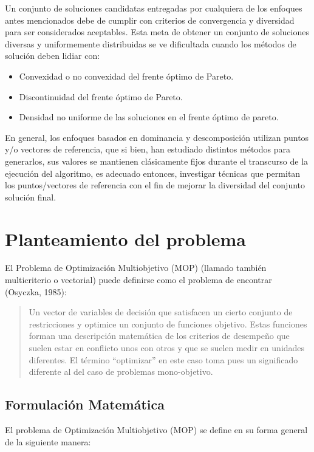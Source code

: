 \documentclass[letterpaper,10pt]{article}
\begin{document}
Un conjunto de soluciones candidatas entregadas por cualquiera de los enfoques antes mencionados debe de cumplir con criterios de convergencia y diversidad para ser
considerados aceptables. Esta meta de obtener un conjunto de soluciones diversas y uniformemente distribuidas se ve dificultada cuando los métodos de solución deben lidiar con:

\begin{itemize}
 \item Convexidad o no convexidad del frente óptimo de Pareto.
 \item Discontinuidad del frente óptimo de Pareto.
 \item Densidad no uniforme de las soluciones en el frente óptimo de pareto.
\end{itemize}

En general, los enfoques basados en dominancia y descomposición utilizan puntos y/o vectores de referencia, que si bien, han estudiado distintos métodos para generarlos,
sus valores se mantienen clásicamente fijos durante el transcurso de la ejecución del algoritmo, es adecuado entonces, investigar técnicas que permitan los puntos/vectores
de referencia con el fin de mejorar la diversidad del conjunto solución final.
 
\section{Planteamiento del problema}

El Problema de Optimización Multiobjetivo (MOP) (llamado también
multicriterio o vectorial) puede definirse como el problema de
encontrar (Osyczka, 1985)\cite{Osyczka1985193}:
\begin{quote}
Un vector de variables de decisión que satisfacen un cierto
conjunto de restricciones y optimice un conjunto de funciones
objetivo. Estas funciones forman una descripción matemática
de los criterios de desempeño que suelen estar en conflicto
unos con otros y que se suelen medir en unidades diferentes.
El término ``optimizar'' en este caso toma pues un significado
diferente al del caso de problemas mono-objetivo.
\end{quote}



\subsection{Formulación Matemática}
El problema de Optimización Multiobjetivo (MOP) se define en su forma general de la siguiente manera:
 
\end{document}
